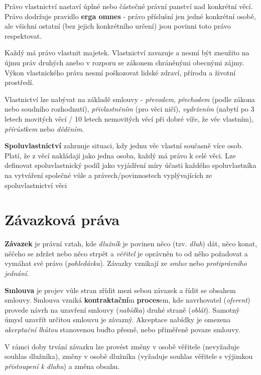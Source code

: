 Právo vlastnictví nastaví úplné nebo částečné právní panství nad konkrétní věcí. Právo dodržuje pravidlo \textbf{erga omnes} - právo příslušní jen jedné konkrétní osobě, ale všichni ostatní (bez jejich konkrétního určení) jsou povinni toto právo respektovat.

Každý má právo vlastnit majetek. Vlastnictví zavazuje a nesmí být zneužito na újmu práv druhých anebo v rozporu se zákonem chráněnými obecnými zájmy. Výkon vlastnického práva nesmí poškozovat lidské zdraví, přírodu a životní prostředí.

Vlastnictví lze nabývat na základě smlouvy - \textit{převodem}, \textit{přechodem} (podle zákona nebo soudního rozhodnutí), \textit{přivlastněním} (pro věci ničí), \textit{vydržením} (nabytí po 3 letech movitých věcí / 10 letech nemovitých věcí při dobré víře, že věc vlastním), \textit{přírůstkem} nebo \textit{děděním}.

\textbf{Spoluvlastnictví} zahrnuje situaci, kdy jednu věc vlastní současně více osob. Platí, že z věcí nakládají jako jedna osoba, každý má právo k celé věci. Lze definovat spoluvlastnický podíl jako vyjádření míry účasti každého spoluvlastníka na vytváření společné vůle a právech/povinnostech vyplývajících ze spoluvlastnictví věci

\section{Závazková práva}

\textbf{Závazek} je právní vztah, kde \textit{dlužník} je povinen něco (tzv. \textit{dluh}) dát, něco konat, něčeho se zdržet nebo něco strpět a \textit{věřitel} je oprávněn to od něho požadovat a vymáhat své právo (\textit{pohledávka}). Závazky vznikají ze \textit{smluv} nebo \textit{protiprávního jednání}.

\textbf{Smlouva} je projev vůle stran zřídit mezi sebou závazek a řídit se obsahem smlouvy. Smlouva vzniká \textbf{kontraktační}m \textbf{proces}em, kde navrhovatel (\textit{oferent}) provede návrh na uzavření smlouvy (\textit{nabídka}) druhé straně (\textit{oblát}). Samotný úmysl uzavřít určitou smlouvu je závazný. Akceptace nabídky je omezena \textit{akceptační lhůtou} stanovenou buďto přesně, nebo přiměřeně povaze smlouvy.

V rámci doby trvání závazku lze provést změny v osobě věřitele (nevyžaduje souhlas dlužníka), změny v osobě dlužníka (vyžaduje souhlas věřitele s výjimkou \textit{přistoupení k dluhu}) a změna obsahu.

